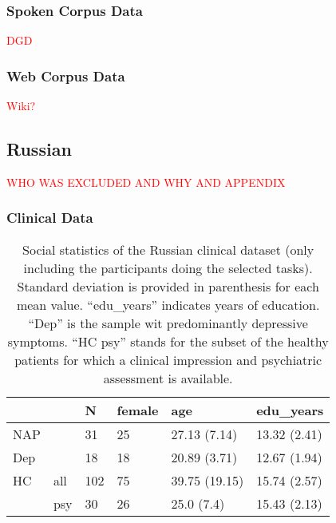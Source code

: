\subsubsection{Spoken Corpus Data}
\textcolor{red}{DGD}

\subsubsection{Web Corpus Data}
\textcolor{red}{Wiki?}



\subsection{Russian}
\label{sec:methods:data:russian}

\textcolor{red}{WHO WAS EXCLUDED AND WHY AND APPENDIX}

\subsubsection{Clinical Data}
\begin{table}[h!]
\begin{center}
\begin{tabular}{llllll}
\hline
    &     & \textbf{N} & \textbf{female} & \textbf{age}  & \textbf{edu\_years} \\ \hline
NAP &     & 31         & 25              & 27.13 (7.14)  & 13.32 (2.41)        \\
Dep &     & 18         & 18              & 20.89 (3.71)  & 12.67 (1.94)        \\
HC  & all & 102 & 75     & 39.75 (19.15) & 15.74 (2.57) \\
    & psy & 30  & 26     & 25.0 (7.4)    & 15.43 (2.13)        \\ \hline
\end{tabular}
\captionsetup{width=\textwidth}
\caption[Russian Clinical Dataset.]{\label{tab:data:ru:sample} Social statistics of the Russian clinical dataset (only including the participants doing the selected tasks). Standard deviation is provided in parenthesis for each mean value. ``edu\_years'' indicates years of education. ``Dep'' is the sample wit predominantly depressive symptoms. ``HC psy'' stands for the subset of the healthy patients for which a clinical impression and psychiatric assessment is available.}
\end{center}
\end{table}

